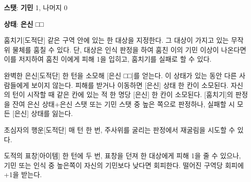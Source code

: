 \documentclass{report}
\begin{document}
	\textbf{스탯}: \textbf{기민} 1, 나머지 0
	
	\textbf{상태}: \textbf{은신} □□
	
	\begin{spoiler}{훔치기}{[도적단]}
		같은 구역 안에 있는 한 대상을 지정한다. 그 대상이 가지고 있는 무작위 물체를 훔칠 수 있다. 단, 대상은 인식 판정을 하여 훔친 이의 기민 이상이 나온다면 이를 저지하여 훔친 이에게 피해 1을 입히고, 훔치기를 실패로 할 수 있다.
	\end{spoiler}
	
	\begin{spoiler}{완벽한 은신}{[도적단]}
		한 턴을 소모해 [은신 □□]를 얻는다. 이 상태가 있는 동안 다른 사람들에게 보이지 않는다. 피해를 받거나 이동하면 [은신] 상태 한 칸이 소모된다. 자신의 턴이 시작할 때 같은 칸에 있는 적 한 명당 [은신] 한 칸이 소모된다. [훔치기]의 판정을 잔여 은신 상태+은신 스탯 또는 기민 스탯 중 높은 쪽으로 판정하나, 실패할 시 모든 [은신] 상태를 잃는다.
	\end{spoiler}
	
	\begin{spoiler}{초심자의 행운}{[도적단]}
		매 턴 한 번, 주사위를 굴리는 판정에서 재굴림을 시도할 수 있다.
	\end{spoiler}
	
	\begin{spoiler}{도적의 표창}{[아이템]}
		한 턴에 두 번, 표창을 던져 한 대상에게 피해 1을 줄 수 있으나, 기민 또는 인식 중 높은쪽이 자신의 기민보다 낮다면 회피한다. 떨어진 구역당 회피에 +1을 받는다.
	\end{spoiler}
\end{document}
